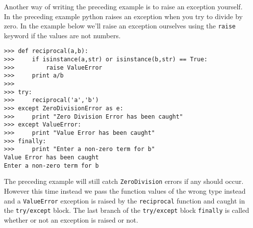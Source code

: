 \documentclass[letterpaper,11pt]{article}
\begin{document}
\par{Another way of writing the preceding example is to raise an exception
yourself. In the preceding example python raises an exception when you try to
divide by zero. In the example below we'll raise an exception ourselves using
the \texttt{raise} keyword if the values are not numbers.}
\\
\begin{minipage}{.75\textwidth}
    \begin{tcolorbox}
        \begin{footnotesize}
            \begin{verbatim}
>>> def reciprocal(a,b):
>>>     if isinstance(a,str) or isinstance(b,str) == True:
>>>         raise ValueError
>>>     print a/b
>>> 
>>> try: 
>>>     reciprocal('a','b')
>>> except ZeroDivisionError as e:
>>>     print "Zero Division Error has been caught"
>>> except ValueError:
>>>     print "Value Error has been caught"
>>> finally:
>>>     print "Enter a non-zero term for b"
Value Error has been caught
Enter a non-zero term for b
            \end{verbatim}
        \end{footnotesize}
    \end{tcolorbox}
\end{minipage}
\par{The preceding example will still catch \texttt{ZeroDivision} errors if
any should occur. However this time instead we pass the function values of the
wrong type instead and a \texttt{ValueError} exception  is raised by the
\texttt{reciprocal} function and caught in the \texttt{try/except} block. The
last branch of the \texttt{try/except} block \texttt{finally} is called whether
or not an exception is raised or not.}
\end{document}
